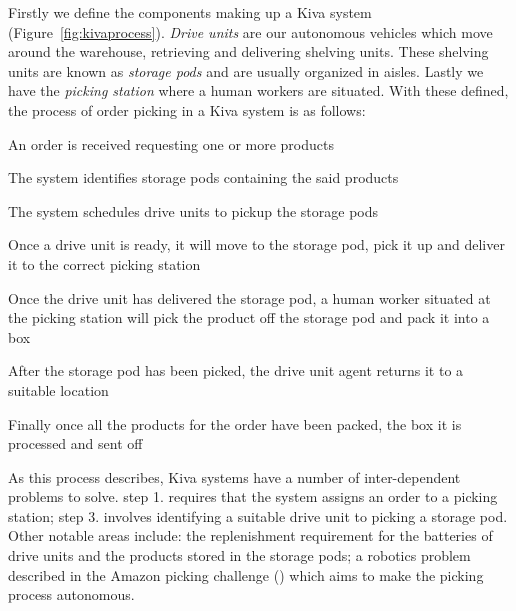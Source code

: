 \documentclass[a4paper,11pt]{article}
\begin{document}
Firstly we define the components making up a Kiva system (Figure~\ref{fig:kivaprocess}). \textit{Drive units} are our autonomous vehicles which move around the warehouse, retrieving and delivering shelving units. These shelving units are known as \textit{storage pods} and are usually organized in aisles. Lastly we have the \textit{picking station} where a human workers are situated. With these defined, the process of order picking in a Kiva system is as follows:
\begin{compactenum}
	\item An order is received requesting one or more products
	\item The system identifies storage pods containing the said products
	\item The system schedules drive units to pickup the storage pods
	\item Once a drive unit is ready, it will move to the storage pod, pick it up and deliver it to the correct picking station
	\item Once the drive unit has delivered the storage pod, a human worker situated at the picking station will pick the product off the storage pod and pack it into a box
	\item After the storage pod has been picked, the drive unit agent returns it to a suitable location
	\item Finally once all the products for the order have been packed, the box it is processed and sent off
\end{compactenum}




\noindent As this process describes, Kiva systems have a number of inter-dependent problems to solve. step 1. requires that the system assigns an order to a picking station; step 3. involves identifying a suitable drive unit to picking a storage pod. Other notable areas include: the replenishment requirement for the batteries of drive units and the products stored in the storage pods; a robotics problem described in the Amazon picking challenge (\cite{correll2016lessons}) which aims to make the picking process autonomous.
\end{document}
